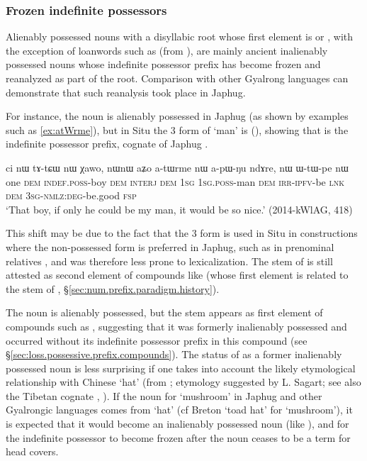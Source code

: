 \subsubsection{Frozen indefinite possessors} \label{sec:frozen.indef}
Alienably possessed nouns with a disyllabic root whose first element is  or , with the exception of loanwords such as  (from ), are mainly ancient inalienably possessed nouns whose indefinite possessor prefix  has become frozen and reanalyzed as part of the root. Comparison with other Gyalrong languages can demonstrate that such reanalysis took place in Japhug.

For instance, the noun  is alienably possessed in Japhug (as shown by examples such as \ref{ex:atWrme}), but in Situ the 3\sg{} form of  `man' is   (\citealt[183;197]{lin09phd}), showing that  is the indefinite possessor prefix, cognate of Japhug . 

\begin{exe}
\ex \label{ex:atWrme}
\gll ci nɯ tɤ-tɕɯ nɯ χawo, nɯnɯ aʑo a-tɯrme nɯ a-pɯ-ŋu ndɤre, nɯ ɯ-tɯ-pe nɯ\\
one \textsc{dem} \textsc{indef}.\textsc{poss}-boy \textsc{dem} \textsc{interj} \textsc{dem} \textsc{1sg} \textsc{1sg}.\textsc{poss}-man \textsc{dem} \textsc{irr}-\textsc{ipfv}-be \textsc{lnk} \textsc{dem} \textsc{3sg}-\textsc{nmlz}:\textsc{deg}-be.good \textsc{fsp} \\
\glt `That boy, if only he could be my man, it would be so nice.' (2014-kWlAG, 418)
\end{exe}

This shift may be due to the fact that the 3\sg{} form is used in Situ in constructions where the non-possessed form is preferred in Japhug, such as in prenominal relatives \citep[190]{lin09phd}, and was therefore less prone to lexicalization. The stem  of   is still attested as second element of compounds like  (whose first element  is related to the stem of , §\ref{sec:num.prefix.paradigm.history}).  

The noun  is  alienably possessed, but the stem  appears as first element of compounds such as , suggesting that it was formerly inalienably possessed and occurred without its indefinite possessor prefix in this compound (see §\ref{sec:loss.possessive.prefix.compounds}). The status of  as a former inalienably possessed noun is less surprising if one takes into account the likely etymological relationship with Chinese   `hat' (from ; etymology suggested by L. Sagart; see also the Tibetan cognate , \citealt{zhangsy19cognates}).  If the noun for `mushroom' in Japhug and other Gyalrongic languages comes from `hat' (cf Breton  `toad hat' for `mushroom'), it is expected that it would become an inalienably possessed noun (like ), and for the indefinite possessor  to become frozen after the noun ceases to be a term for head covers.
 

